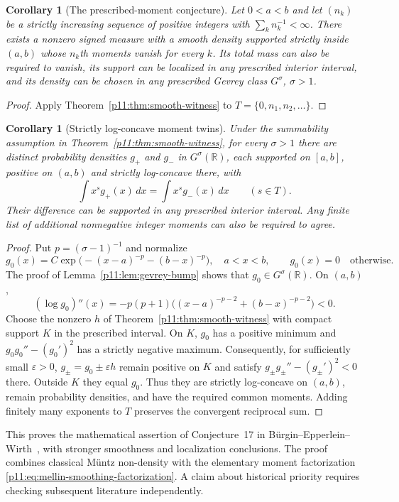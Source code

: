 \documentclass[11pt,letterpaper]{article}
\newtheorem{corollary}[theorem]{Corollary}
\theoremstyle{definition}
\theoremstyle{remark}
\newcommand{\1}{\mathbf 1}
\begin{document}
\begin{corollary}[The prescribed-moment conjecture]\label{p11:cor:bew-conjecture}
Let $0<a<b$ and let $(n_k)$ be a strictly increasing sequence of positive
integers with $\sum_k n_k^{-1}<\infty$. There exists a nonzero signed
measure with a smooth density supported strictly inside $(a,b)$ whose
$n_k$th moments vanish for every $k$. Its total mass can also be required
to vanish, its support can be localized in any prescribed interior
interval, and its density can be chosen in any prescribed Gevrey class
$G^\sigma$, $\sigma>1$.
\end{corollary}
\begin{proof}
Apply Theorem~\ref{p11:thm:smooth-witness} to $T=\{0,n_1,n_2,\ldots\}$.
\end{proof}

\begin{corollary}[Strictly log-concave moment twins]\label{p11:cor:logconcave-twins}
Under the summability assumption in Theorem~\ref{p11:thm:smooth-witness},
for every $\sigma>1$ there are distinct probability densities $g_+$ and
$g_-$ in $G^\sigma(\mathbb R)$, each supported on $[a,b]$, positive on
$(a,b)$ and strictly log-concave there, with
\[
 \int x^s g_+(x)\,dx=\int x^s g_-(x)\,dx\qquad(s\in T).
\]
Their difference can be supported in any prescribed interior interval.
Any finite list of additional nonnegative integer moments can also be
required to agree.
\end{corollary}
\begin{proof}
Put $p=(\sigma-1)^{-1}$ and normalize
\[
 g_0(x)=C\exp\bigl(-(x-a)^{-p}-(b-x)^{-p}\bigr),\quad a<x<b,
 \qquad g_0(x)=0\quad\text{otherwise}.
\]
The proof of Lemma~\ref{p11:lem:gevrey-bump} shows that
$g_0\in G^\sigma(\mathbb R)$. On $(a,b)$,
\[
 (\log g_0)''(x)
 =-p(p+1)\bigl((x-a)^{-p-2}+(b-x)^{-p-2}\bigr)<0.
\]
Choose the nonzero $h$ of Theorem~\ref{p11:thm:smooth-witness} with compact
support $K$ in the prescribed interval. On $K$, $g_0$ has a positive
minimum and $g_0g_0''-(g_0')^2$ has a strictly negative maximum.
Consequently, for sufficiently small $\varepsilon>0$,
$g_\pm=g_0\pm\varepsilon h$ remain positive on $K$ and satisfy
$g_\pm g_\pm''-(g_\pm')^2<0$ there. Outside $K$ they equal $g_0$.
Thus they are strictly log-concave on $(a,b)$, remain probability
densities, and have the required common moments. Adding finitely many
exponents to $T$ preserves the convergent reciprocal sum.
\end{proof}

This proves the mathematical assertion of Conjecture~17 in
B\"urgin--Epperlein--Wirth~\cite{BurginEpperleinWirth2022}, with stronger
smoothness and localization conclusions. The proof combines classical
M\"untz non-density with the elementary moment factorization
\eqref{p11:eq:mellin-smoothing-factorization}. A claim about historical
priority requires checking subsequent literature independently.
\end{document}
